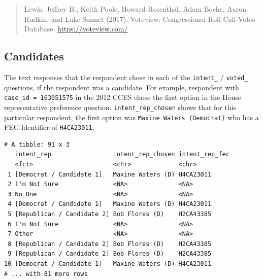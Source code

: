 \documentclass[10pt,article,oneside]{memoir}
\theoremstyle{definition}
\newenvironment{Shaded}{\begin{snugshade}}{\end{snugshade}}
\newcommand{\KeywordTok}[1]{\textcolor[rgb]{0.13,0.29,0.53}{\textbf{#1}}}
\newcommand{\DecValTok}[1]{\textcolor[rgb]{0.00,0.00,0.81}{#1}}
\newcommand{\StringTok}[1]{\textcolor[rgb]{0.31,0.60,0.02}{#1}}
\newcommand{\OperatorTok}[1]{\textcolor[rgb]{0.81,0.36,0.00}{\textbf{#1}}}
\newcommand{\NormalTok}[1]{#1}
\begin{document}
\begin{quote}
Lewis, Jeffrey B., Keith Poole, Howard Rosenthal, Adam Boche, Aaron
Rudkin, and Luke Sonnet (2017). Voteview: Congressional Roll-Call Votes
Database. \url{https://voteview.com/}
\end{quote}

\subsection{Candidates}\label{candidates}

The text responses that the respondent chose in each of the
\texttt{intent\_} / \texttt{voted\_} questions, if the respondent was a
candidate. For example, respondent with \texttt{case\_id\ =\ 163051575}
in the 2012 CCES chose the first option in the House representative
preference question. \texttt{intent\_rep\_chosen} shows that for this
particular respondent, the first option was
\texttt{Maxine\ Waters\ (Democrat)} who has a FEC Identifier of
\texttt{H4CA23011}.

\begin{Shaded}
\end{Shaded}

\begin{verbatim}
# A tibble: 91 x 3
   intent_rep                 intent_rep_chosen intent_rep_fec
   <fct>                      <chr>             <chr>         
 1 [Democrat / Candidate 1]   Maxine Waters (D) H4CA23011     
 2 I'm Not Sure               <NA>              <NA>          
 3 No One                     <NA>              <NA>          
 4 [Democrat / Candidate 1]   Maxine Waters (D) H4CA23011     
 5 [Republican / Candidate 2] Bob Flores (D)    H2CA43385     
 6 I'm Not Sure               <NA>              <NA>          
 7 Other                      <NA>              <NA>          
 8 [Republican / Candidate 2] Bob Flores (D)    H2CA43385     
 9 [Republican / Candidate 2] Bob Flores (D)    H2CA43385     
10 [Democrat / Candidate 1]   Maxine Waters (D) H4CA23011     
# ... with 81 more rows
\end{verbatim}
\end{document}

